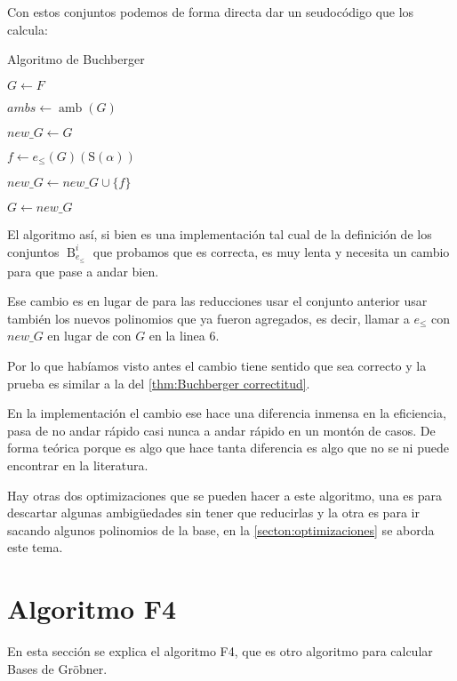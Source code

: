 \documentclass[12pt]{report}
\theoremstyle{customstyle}
\theoremstyle{factstyle}
\DeclareMathOperator{\amb}{amb}
\renewcommand{\S}{\text{S}}
\DeclareMathOperator{\B}{B}
\begin{document}
Con estos conjuntos podemos de forma directa dar un seudocódigo que los calcula:

\begin{algorithm}[H] %
  \caption{Algoritmo de Buchberger}\label{alg:Buchberger}
  $G ← F$

  \Loop{} {
    $ambs ← \amb(G)$

    $new\_G ← G$

     {
      $f ← e_≤(G)(\S(α))$

       {
        $new\_G ← new\_G ∪ \{f\}$
      }
    }

     {
      \Break
    }

    $G ← new\_G$
  }
\end{algorithm}

El algoritmo así, si bien es una implementación tal cual de la definición de los conjuntos $\B_{e_≤}^i$ que probamos que es correcta, es muy lenta y necesita un cambio para que pase a andar bien.

Ese cambio es en lugar de para las reducciones usar el conjunto anterior usar también los nuevos polinomios que ya fueron agregados, es decir, llamar a $e_≤$ con $new\_G$ en lugar de con $G$ en la linea 6. %

Por lo que habíamos visto antes el cambio tiene sentido que sea correcto y la prueba es similar a la del \cref{thm:Buchberger correctitud}.

En la implementación el cambio ese hace una diferencia inmensa en la eficiencia, pasa de no andar rápido casi nunca a andar rápido en un montón de casos. De forma teórica porque es algo que hace tanta diferencia es algo que no se ni puede encontrar en la literatura.

Hay otras dos optimizaciones que se pueden hacer a este algoritmo, una es para descartar algunas ambigüedades sin tener que reducirlas y la otra es para ir sacando algunos polinomios de la base, en la \cref{secton:optimizaciones} se aborda este tema.

\section{Algoritmo F4}

En esta sección se explica el algoritmo F4, que es otro algoritmo para calcular Bases de Gröbner.
\end{document}
